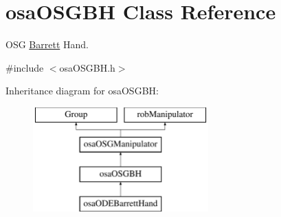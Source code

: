 \hypertarget{classosa_o_s_g_b_h}{}\section{osa\+O\+S\+G\+B\+H Class Reference}
\label{classosa_o_s_g_b_h}


O\+S\+G \hyperlink{struct_barrett}{Barrett} Hand.  




{\ttfamily \#include $<$osa\+O\+S\+G\+B\+H.\+h$>$}

Inheritance diagram for osa\+O\+S\+G\+B\+H\+:\begin{figure}[H]
\begin{center}
\leavevmode
\includegraphics[height=4.000000cm]{de/d25/classosa_o_s_g_b_h}
\end{center}
\end{figure}
